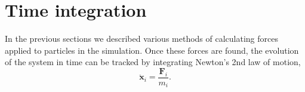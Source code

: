 \section{Time integration}
In the previous sections we described various methods of calculating forces applied to particles in the simulation.
Once these forces are found, the evolution of the system in time can be tracked by integrating Newton's 2nd law of motion,
\begin{equation}\label{eq:newtons-second}
    \ddot{\mathbf{x}}_i = \frac{\mathbf{F}_i}{m_i}.
\end{equation}



